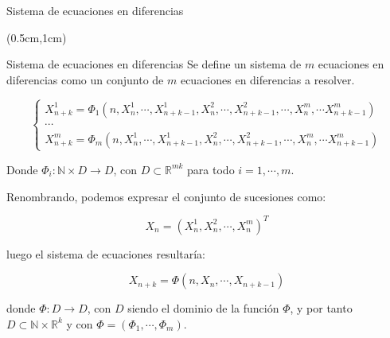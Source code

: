 \begin{frame}{Sistema de ecuaciones en diferencias}

    \begin{textblock*}{12cm}(0.5cm,1cm)
	
        \begin{block}{Sistema de ecuaciones en diferencias}
            Se define un sistema de $m$ ecuaciones en diferencias como un conjunto de $m$ ecuaciones en diferencias a resolver.

            \begin{equation}
            \begin{cases}
            X_{n+k}^1 = \Phi_1(n, X_n^1, \cdots , X_{n+k-1}^1, X_{n}^2, \cdots , X_{n+k-1}^2, \cdots , X_{n}^m, \cdots X_{n+k-1}^m) \\
            \cdots \\
            X_{n+k}^m = \Phi_m(n, X_n^1, \cdots , X_{n+k-1}^1, X_{n}^2, \cdots , X_{n+k-1}^2, \cdots , X_{n}^m, \cdots X_{n+k-1}^m)
            \end{cases}
            \end{equation}

            Donde $\Phi_i : \mathbb{N}\times D \rightarrow D$, con $D\subset \mathbb{R}^{mk}$ para todo $i=1,\cdots , m$.

            Renombrando, podemos expresar el conjunto de sucesiones como:

            \begin{equation}
            X_n = (X_{n}^1, X_{n}^2, \cdots , X_{n}^m)^{T}
            \end{equation}

            luego el sistema de ecuaciones resultaría:

            \begin{equation}
            \label{def_sist_ec}
            X_{n+k} = \Phi (n, X_n, \cdots , X_{n+k-1})
            \end{equation}


            donde $\Phi : D \rightarrow D$, con $D$ siendo el dominio de la función $\Phi$, y por tanto $D\subset \mathbb{N}\times\mathbb{R}^k$ y con $\Phi = (\Phi_1, \cdots , \Phi_m)$.
        \end{block}
        
    \end{textblock*}


\end{frame}


